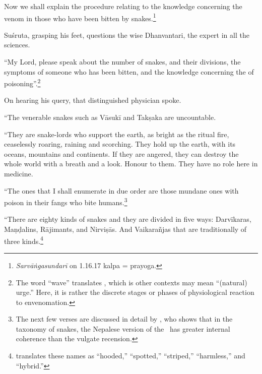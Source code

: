 \begin{translation}
    \item[1] Now we shall explain the procedure relating to the
knowledge concerning the venom in those who have been bitten by 
snakes.\footnote{\emph{Sarvāṅgasundarī} on 1.16.17 kalpa = prayoga.}
    
    \item[3] Suśruta, grasping his feet, questions the wise Dhanvantari, the 
    expert in all the sciences.
    
    \item[4]
    
    “My Lord, please speak about the number of snakes, and their divisions,
the symptoms of someone who has been bitten, and the knowledge
concerning the  of poisoning”.\footnote{The word
    “wave” translates , which is other contexts may mean
    “(natural) urge.”  Here, it is rather the discrete stages or phases of
    physiological reaction to envenomation.}
        
    \item[5]
    
    On hearing his query, that distinguished physician spoke.
    
    “The venerable snakes such as Vāsukī and Takṣaka are uncountable. 
    
\item[6--9ab]

“They are snake-lords who support the earth, as bright as the ritual fire,
ceaselessly roaring, raining and scorching. They hold up the earth, with its
oceans, mountains and continents. If they are angered, they can destroy the
whole world with a breath and a look.  Honour to them. They have no role
here in medicine.

“The ones that I shall enumerate in due order are those mundane
ones with poison in their fangs who bite humans.\footnote{The next few
    verses are discussed in detail by \citet[101--104]{hari-2011}, who shows
    that in the taxonomy of snakes, the Nepalese version of the \SS\ has greater
    internal coherence than the vulgate recension.}

\item[9cd--10]    

“There are eighty kinds of snakes and they are divided in five ways:
Darvīkaras, Maṇḍalins, Rājimants, and Nirviṣās.  And Vaikarañjas that are
traditionally of three kinds.\footnote{\citet{hari-2011} translates these
    names as “hooded,” “spotted,” “striped,” “harmless,” and “hybrid.”}
\end{translation}
